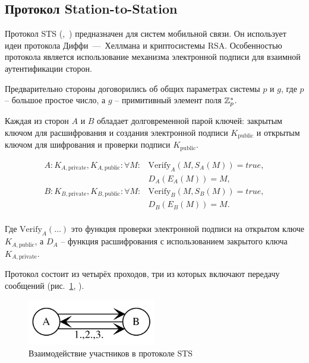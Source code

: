 \subsection{Протокол Station-to-Station}\label{section-protocols-sts}

Протокол STS (,~\cite{Diffie:Oorschot:Wiener:1992}) предназначен для систем мобильной связи. Он использует идеи протокола Диффи~---~Хеллмана и криптосистемы RSA. Особенностью протокола является использование механизма электронной подписи для взаимной аутентификации сторон.

Предварительно стороны договорились об общих параметрах системы $p$ и $g$, где $p$ -- большое простое число, а $g$ -- примитивный элемент поля $\mathbb{Z}_p^*$.

Каждая из сторон $A$ и $B$ обладает долговременной парой ключей: закрытым ключом для расшифрования и создания электронной подписи $K_{\text{public}}$ и открытым ключом для шифрования и проверки подписи $K_{\text{public}}$.

\[\begin{array}{ll}
    A: K_{A,\text{private}}, K_{A,\text{public}}: \forall M : & \text{Verify}_A ( M, S_A( M ) ) = true, \\
                                                & D_A ( E_A( M ) ) = M, \\
    B: K_{B,\text{private}}, K_{B,\text{public}}: \forall M : & \text{Verify}_B ( M, S_B( M ) ) = true, \\
                                                & D_B ( E_B( M ) ) = M. \\
\end{array}\]

Где $\text{Verify}_A(\dots)$ это функция проверки электронной подписи на открытом ключе $K_{A, \text{public}}$, а $D_A$ -- функция расшифрования с использованием закрытого ключа $K_{A, \text{private}}$.

Протокол состоит из четырёх проходов, три из которых включают передачу сообщений (рис.~\ref{fig:key_distribution-sts}, \cite{Cheremushkin:2009}).

\begin{figure}
    \centering
    \includegraphics[width=0.5\textwidth]{pic/key_distribution-sts}
    \caption{Взаимодействие участников в протоколе STS\label{fig:key_distribution-sts}}
\end{figure}


